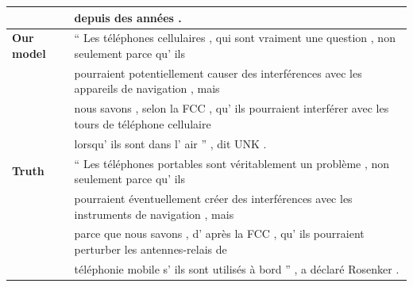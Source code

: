 \begin{table}[ht!]
\begin{footnotesize}
\begin{tabular}{|l|l|}
& depuis des ann\'{e}es .\\
\hline\hline
{\bf Our model} & 
`` Les t\'{e}l\'{e}phones cellulaires , qui sont vraiment une question , non seulement parce qu' ils \\
& pourraient potentiellement causer des interf\'{e}rences avec les appareils de navigation , mais \\
& nous savons , selon la FCC , qu' ils pourraient interf\'{e}rer avec les tours de t\'{e}l\'{e}phone cellulaire \\
& lorsqu' ils sont dans l' air '' , dit UNK .\\
\hline
{\bf Truth} & 
`` Les t\'{e}l\'{e}phones portables sont v\'{e}ritablement un probl\`{e}me , non seulement parce qu' ils \\
& pourraient \'{e}ventuellement cr\'{e}er des interf\'{e}rences avec les instruments de navigation , mais \\
& parce que nous savons , d' apr\`{e}s la FCC , qu' ils pourraient perturber les antennes-relais de \\
& t\'{e}l\'{e}phonie mobile s' ils sont utilis\'{e}s \`{a} bord '' , a d\'{e}clar\'{e} Rosenker .\\

\end{tabular}
\end{footnotesize}
\end{table}
